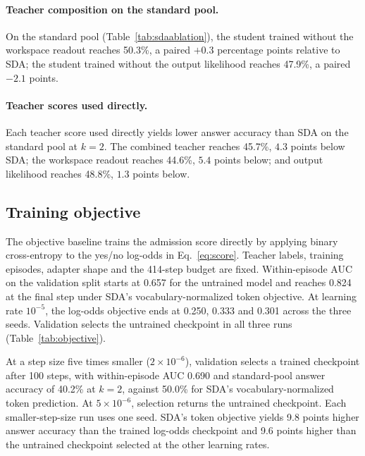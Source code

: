\begin{table}[t]
\centering\small
\caption{Workspace readout variants on the standard pool, Qwen3-8B,
with 1,607 candidates. Entries are pooled and within-episode AUCs.}
\label{tab:candidatereadout}

\end{table}

\paragraph{Teacher composition on the standard pool.}
On the standard pool (Table~\ref{tab:sdaablation}), the student trained
without the workspace readout reaches 50.3\%, a paired $+0.3$ percentage
points relative to SDA; the student trained without the output
likelihood reaches 47.9\%, a paired $-2.1$ points.



\paragraph{Teacher scores used directly.}
Each teacher score used directly yields lower answer accuracy than SDA
on the standard pool at $k=2$. The combined teacher reaches 45.7\%,
$4.3$ points below SDA; the workspace readout reaches 44.6\%, $5.4$
points below; and output likelihood reaches 48.8\%, $1.3$ points below.

\subsection{Training objective}
\label{app:objective}

The objective baseline trains the admission score directly by applying
binary cross-entropy to the yes/no log-odds in Eq.~\eqref{eq:score}.
Teacher labels, training episodes, adapter shape and the 414-step
budget are fixed. Within-episode AUC on the validation split starts at
0.657 for the untrained model and reaches 0.824 at the final step under
SDA's vocabulary-normalized token objective.
At learning rate $10^{-5}$, the log-odds objective ends at
0.250, 0.333 and 0.301 across the three seeds. Validation selects the
untrained checkpoint in all three runs (Table~\ref{tab:objective}).

At a step size five times smaller ($2\times10^{-6}$), validation
selects a trained checkpoint after 100 steps, with within-episode AUC
0.690 and standard-pool answer accuracy of 40.2\% at $k=2$, against
50.0\% for SDA's vocabulary-normalized token prediction.
At $5\times10^{-6}$, selection returns the untrained checkpoint.
Each smaller-step-size run uses one seed. SDA's token objective yields
9.8 points higher answer accuracy than the trained log-odds checkpoint
and 9.6 points higher than the untrained checkpoint selected at the
other learning rates.


